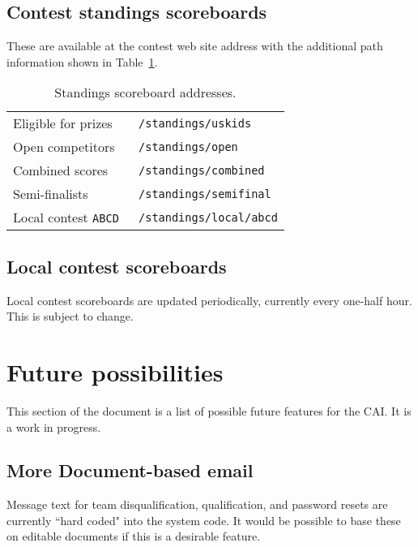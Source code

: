 \documentclass[11pt,letterpaper]{refart}
\begin{document}
\subsection{Contest standings scoreboards}
These are available at the contest web site address with the additional
path information shown in Table~\ref{tbl:scoreboards}.
\begin{table}
\centering
\caption{Standings scoreboard addresses.}
\begin{tabular}{l>{\tt}l}
Eligible for prizes & /standings/uskids \\
Open competitors & /standings/open \\
Combined scores & /standings/combined \\
Semi-finalists & /standings/semifinal \\
Local contest \texttt{ABCD} & /standings/local/abcd
\end{tabular}
\label{tbl:scoreboards}
\end{table}

\subsection{Local contest scoreboards}
Local contest scoreboards are updated periodically, currently every one-half hour.
This is subject to change.

\section{Future possibilities}
This section of the document is a list of possible future features for the CAI.  It is a work
in progress.

\subsection{More Document-based email}
Message text for team disqualification, qualification, and password resets are currently
``hard coded" into the system code.  It would be possible to base these on editable
documents if this is a desirable feature.
\end{document}
